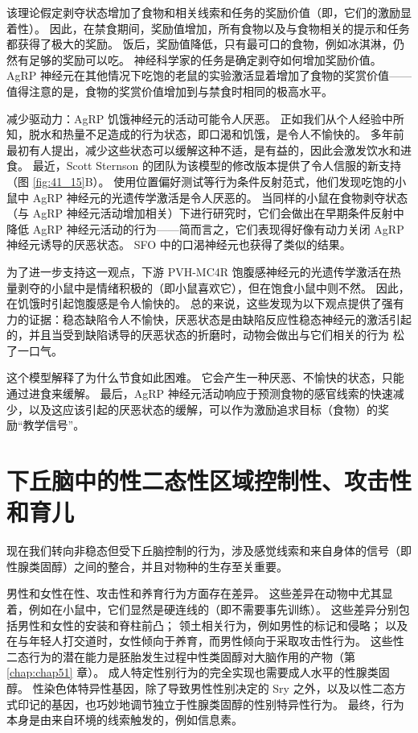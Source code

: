 该理论假定剥夺状态增加了食物和相关线索和任务的奖励价值（即，它们的激励显着性）。 因此，在禁食期间，奖励值增加，所有食物以及与食物相关的提示和任务都获得了极大的奖励。 饭后，奖励值降低，只有最可口的食物，例如冰淇淋，仍然有足够的奖励可以吃。 神经科学家的任务是确定剥夺如何增加奖励价值。 AgRP 神经元在其他情况下吃饱的老鼠的实验激活显着增加了食物的奖赏价值——值得注意的是，食物的奖赏价值增加到与禁食时相同的极高水平。

减少驱动力：AgRP 饥饿神经元的活动可能令人厌恶。 正如我们从个人经验中所知，脱水和热量不足造成的行为状态，即口渴和饥饿，是令人不愉快的。 多年前最初有人提出，减少这些状态可以缓解这种不适，是有益的，因此会激发饮水和进食。 最近，Scott Sternson 的团队为该模型的修改版本提供了令人信服的新支持（图 \ref{fig:41_15}B）。 使用位置偏好测试等行为条件反射范式，他们发现吃饱的小鼠中 AgRP 神经元的光遗传学激活是令人厌恶的。 当同样的小鼠在食物剥夺状态（与 AgRP 神经元活动增加相关）下进行研究时，它们会做出在早期条件反射中降低 AgRP 神经元活动的行为——简而言之，它们表现得好像有动力关闭 AgRP 神经元诱导的厌恶状态。 SFO 中的口渴神经元也获得了类似的结果。

为了进一步支持这一观点，下游 PVH-MC4R 饱腹感神经元的光遗传学激活在热量剥夺的小鼠中是情绪积极的（即小鼠喜欢它），但在饱食小鼠中则不然。 因此，在饥饿时引起饱腹感是令人愉快的。 总的来说，这些发现为以下观点提供了强有力的证据：稳态缺陷令人不愉快，厌恶状态是由缺陷反应性稳态神经元的激活引起的，并且当受到缺陷诱导的厌恶状态的折磨时，动物会做出与它们相关的行为 松了一口气。

这个模型解释了为什么节食如此困难。 它会产生一种厌恶、不愉快的状态，只能通过进食来缓解。 最后，AgRP 神经元活动响应于预测食物的感官线索的快速减少，以及这应该引起的厌恶状态的缓解，可以作为激励追求目标（食物）的奖励“教学信号”。


\section{下丘脑中的性二态性区域控制性、攻击性和育儿}
现在我们转向非稳态但受下丘脑控制的行为，涉及感觉线索和来自身体的信号（即性腺类固醇）之间的整合，并且对物种的生存至关重要。

男性和女性在性、攻击性和养育行为方面存在差异。 这些差异在动物中尤其显着，例如在小鼠中，它们显然是硬连线的（即不需要事先训练）。 这些差异分别包括男性和女性的安装和脊柱前凸； 领土相关行为，例如男性的标记和侵略； 以及在与年轻人打交道时，女性倾向于养育，而男性倾向于采取攻击性行为。 这些性二态行为的潜在能力是胚胎发生过程中性类固醇对大脑作用的产物（第 \ref{chap:chap51} 章）。 成人特定性别行为的完全实现也需要成人水平的性腺类固醇。 性染色体特异性基因，除了导致男性性别决定的 Sry 之外，以及以性二态方式印记的基因，也巧妙地调节独立于性腺类固醇的性别特异性行为。 最终，行为本身是由来自环境的线索触发的，例如信息素。

